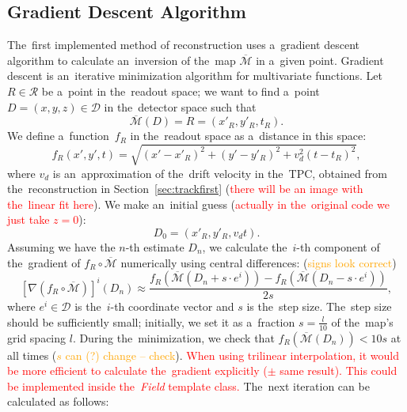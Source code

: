 		\subsection{Gradient Descent Algorithm}
		\label{sec:grad}			
			The~first implemented method of reconstruction uses a~gradient descent algorithm to calculate an~inversion of the~map $\overbar{\mathcal{M}}$ in a~given point. Gradient descent is an~iterative minimization algorithm for multivariate functions. Let $R\in\mathcal{R}$ be a~point in the~readout space; we want to find a~point $D = (x,y,z) \in\mathcal{D}$ in the~detector space such that 
				\begin{equation}
					\overbar{\mathcal{M}}(D) = R = (x'_R,y'_R,t_R).
				\end{equation}
			We define a~function~$f_R$ in the~readout space as a~distance in this space:
				\begin{equation}
					f_R(x',y',t) = \sqrt{(x'-x'_R)^2+(y'-y'_R)^2+v_d^2(t-t_R)^2},
				\end{equation}
			where $v_d$ is an~approximation of the~drift velocity in the~\ac{TPC}, obtained from the~reconstruction in Section~\ref{sec:trackfirst} (\textcolor{red}{there will be an image with the~linear fit here}). We make an~initial guess (\textcolor{red}{actually in the~original code we just take $z=0$}):
				\begin{equation}
					D_0 = (x'_R,y'_R,v_dt).
				\end{equation}
			Assuming we have the $n$-th estimate $D_n$, we calculate the~$i$-th component of the~gradient of $f_R\circ\overbar{\mathcal{M}}$ numerically using central differences: (\textcolor{orange}{signs look correct})
				\begin{equation}
					\left[\nabla(f_R\circ\overbar{\mathcal{M}})\right]^i(D_n) \approx \frac{f_R(\overbar{\mathcal{M}}(D_n+s\cdot e^i))-f_R(\overbar{\mathcal{M}}(D_n-s\cdot e^i))}{2s},
				\end{equation}
			where $e^i\in\mathcal{D}$ is the~$i$-th coordinate vector and $s$ is the~step size. The~step size should be sufficiently small; initially, we set it as a~fraction $s = \frac{l}{10}$ of the~map's grid spacing $l$. During the~minimization, we check that $f_R(\overbar{\mathcal{M}}(D_n))<10s$ at all times (\textcolor{orange}{$s$ can (?) change -- check}). \textcolor{red}{When using trilinear interpolation, it would be more efficient to calculate the~gradient explicitly ($\pm$ same result). This could be implemented inside the~\textit{Field} template class.} The~next iteration can be calculated as follows:
